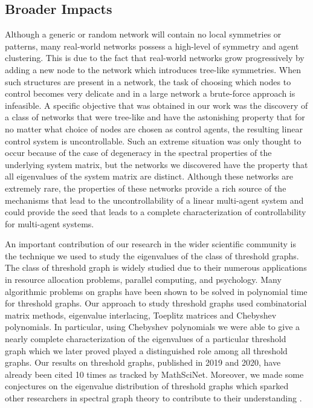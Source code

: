 \documentclass[11pt]{article}
\begin{document}
\subsection{Broader Impacts}
Although a generic or random network will contain no local symmetries or patterns, many real-world networks possess a high-level of symmetry and agent clustering. This is due to the fact that real-world networks grow progressively by adding a new node to the network which introduces tree-like symmetries. When such structures are present in a network, the task of choosing which nodes to control becomes very delicate and in a large network a brute-force approach is infeasible. A specific objective that was obtained in our work was the discovery of a class of networks that were tree-like and have the astonishing property that for no matter what choice of nodes are chosen as control agents, the resulting linear control system is uncontrollable. Such an extreme situation was only thought to occur because of the case of degeneracy in the spectral properties of the underlying system matrix, but the networks we discovered have the property that all eigenvalues of the system matrix are distinct. Although these networks are extremely rare, the properties of these networks provide a rich source of the mechanisms that lead to the uncontrollability of a linear multi-agent system and could provide the seed that leads to a complete characterization of controllability for multi-agent systems.

An important contribution of our research in the wider scientific community is the technique we used to study the eigenvalues of the class of threshold graphs. The class of threshold graph is widely studied due to their numerous applications in resource allocation problems, parallel computing, and psychology. Many algorithmic problems on graphs have been shown to be solved in polynomial time for threshold graphs. Our approach to study threshold graphs used combinatorial matrix methods, eigenvalue interlacing, Toeplitz matrices and Chebyshev polynomials. In particular, using Chebyshev polynomials we were able to give a nearly complete characterization of the eigenvalues of a particular threshold graph which we later proved played a distinguished role among all threshold graphs. Our results on threshold graphs, published in 2019 and 2020, have already been cited 10 times as tracked by MathSciNet. Moreover, we made some conjectures on the eigenvalue distribution of threshold graphs which sparked other researchers in spectral graph theory to contribute to their understanding \cite{MA-EG:23, LA-AE-RB:2017}.
\end{document}
